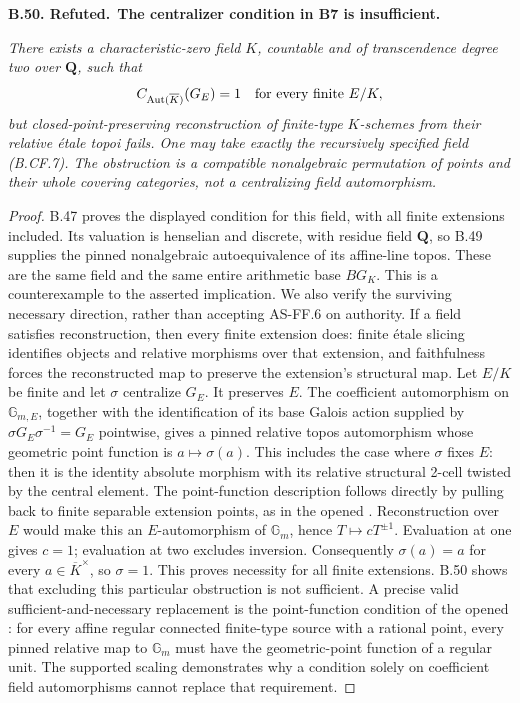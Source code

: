 \documentclass[11pt,a4paper]{article}
\newcommand{\Q}{\mathbf Q}
\newenvironment{claim}[3]{\par\medskip\noindent\hypertarget{#1}{\textbf{#1. #2.}}\ \textbf{#3.}\par\nopagebreak\smallskip\begingroup\itshape}{\endgroup\par\smallskip}
\begin{document}
\begin{claim}{B.50}{Refuted}{The centralizer condition in B7 is insufficient}
There exists a characteristic-zero field \(K\), countable and of
transcendence degree two over \(\Q\), such that
\[
 C_{\operatorname{Aut}(\overline K)}(G_E)=1
           \quad\hbox{for every finite }E/K,
\]
but closed-point-preserving reconstruction of finite-type
\(K\)-schemes from their relative étale topoi fails. One may take
exactly the recursively specified field (B.CF.7). The obstruction
is a compatible nonalgebraic permutation of points and their
whole covering categories, not a centralizing field automorphism.
\end{claim}
\begin{proof}
B.47 proves the displayed condition for this field, with all
finite extensions included. Its valuation is henselian and
discrete, with residue field \(\Q\), so B.49 supplies the
pinned nonalgebraic autoequivalence of its affine-line topos.
These are the same field and the same entire arithmetic base
\(BG_K\). This is a counterexample to the asserted implication.
We also verify the surviving necessary direction, rather than
accepting AS-FF.6 on authority. If a field satisfies reconstruction,
then every finite extension does: finite étale slicing identifies
objects and relative morphisms over that extension, and faithfulness
forces the reconstructed map to preserve the extension's structural
map. Let \(E/K\) be finite and let \(\sigma\) centralize
\(G_E\). It preserves \(E\). The coefficient automorphism on
\(\mathbb G_{m,E}\), together with the identification of its
base Galois action supplied by \(\sigma G_E\sigma^{-1}=G_E\)
pointwise, gives a pinned relative topos automorphism whose geometric
point function is \(a\mapsto\sigma(a)\). This includes the case
where \(\sigma\) fixes \(E\): then it is the identity absolute
morphism with its relative structural 2-cell twisted by the central
element. The point-function description follows directly by pulling
back to finite separable extension points, as in the opened
\citep[Proposition~3.6]{CarlsonHaineWolf2024}.
Reconstruction over \(E\) would make this an \(E\)-automorphism
of \(\mathbb G_m\), hence \(T\mapsto cT^{\pm1}\).
Evaluation at one gives \(c=1\); evaluation at two excludes
inversion. Consequently \(\sigma(a)=a\) for every
\(a\in\overline K^\times\), so \(\sigma=1\).
This proves necessity for all finite extensions. B.50 shows that
excluding this particular obstruction is not sufficient.
A precise valid sufficient-and-necessary replacement is the
point-function condition of the opened
\citep[Theorem~4.18(5)]{CarlsonHaineWolf2024}: for every affine
regular connected finite-type source with a rational point,
every pinned relative map to \(\mathbb G_m\) must have the
geometric-point function of a regular unit. The supported
scaling demonstrates why a condition solely on coefficient
field automorphisms cannot replace that requirement.
\end{proof}
\end{document}
